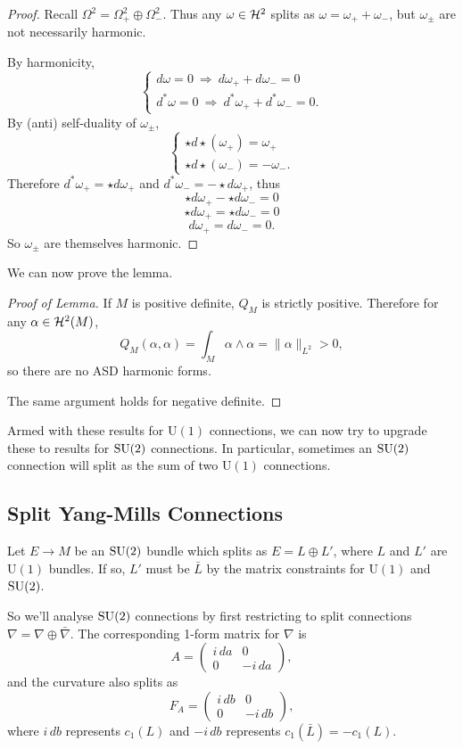 \documentclass[main]{subfiles}
\begin{document}
\begin{proof}
Recall $\Omega^2 = \Omega^2_+ \oplus \Omega^2_-$. Thus any $\omega \in \mathcal{H}^2$ splits as $\omega = \omega_+ + \omega_-$, but $\omega_\pm$ are not necessarily harmonic.

By harmonicity,
\[
\begin{cases} d\omega = 0 \ \Rightarrow\ d\omega_+ + d\omega_- = 0 \\ d^\ast\omega = 0\ \Rightarrow\ d^\ast\omega_+ + d^\ast\omega_- = 0. \end{cases}
\]
By (anti) self-duality of $\omega_\pm$,
\[
\begin{cases} \star d\star(\omega_+) = \omega_+ \\ \star d \star(\omega_-) = -\omega_- .\end{cases}
\]
Therefore $d^\ast\omega_+ = \star d\omega_+$ and $d^\ast\omega_- = -\star d\omega_+$, thus
\[
\star d\omega_+ - \star d\omega_- = 0
\]
\[
\star d\omega_+ = \star d\omega_- = 0
\]
\[
d\omega_+ = d\omega_- = 0.
\]
So $\omega_\pm$ are themselves harmonic.
\end{proof}

We can now prove the lemma.

\begin{proof}[Proof of Lemma]
If $M$ is positive definite, $Q_M$ is strictly positive. Therefore for any $\alpha \in \mathcal{H}^2(M)$,
\[
Q_M(\alpha,\alpha) = \int_M \alpha\wedge\alpha = \|\alpha\|_{L^2} > 0,
\]
so there are no ASD harmonic forms.

The same argument holds for negative definite.
\end{proof}

Armed with these results for $\mathrm{U}(1)$ connections, we can now try to upgrade these to results for $\operatorname{SU}(2)$ connections. In particular, sometimes an $\operatorname{SU}(2)$ connection will split as the sum of two $\mathrm{U}(1)$ connections.

\subsection*{Split Yang-Mills Connections}

Let $E \to M$ be an $\operatorname{SU}(2)$ bundle which splits as $E = L\oplus L'$, where $L$ and $L'$ are $\mathrm{U}(1)$ bundles. If so, $L'$ must be $\bar L$ by the matrix constraints for $\mathrm{U}(1)$ and $\operatorname{SU}(2)$.

So we'll analyse $\operatorname{SU}(2)$ connections by first restricting to split connections $\nabla = \nabla \oplus \bar\nabla$. The corresponding 1-form matrix for $\nabla$ is
\[
A = \begin{pmatrix} i\,da & 0 \\ 0 & -i\,da \end{pmatrix},
\]
and the curvature also splits as
\[
F_A = \begin{pmatrix} i\,db & 0 \\ 0 & -i\,db \end{pmatrix},
\]
where $i\,db$ represents $c_1(L)$ and $-i\,db$ represents $c_1(\bar L) = -c_1(L)$.
\end{document}
